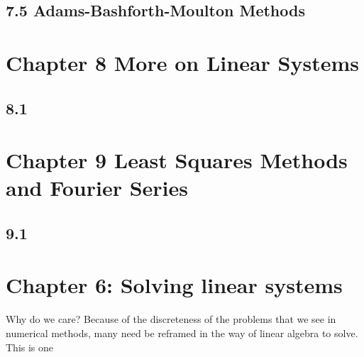 \documentclass{article}
\theoremstyle{remark}
\begin{document}
\subsection{7.5 Adams-Bashforth-Moulton Methods }


\section{Chapter 8 More on Linear Systems} 

\subsection{8.1 }


\section{Chapter 9 Least Squares Methods and Fourier Series} 

\subsection{9.1 }




\section{Chapter 6: Solving linear systems}

Why do we care? Because of the discreteness of the problems that we see in numerical methods, many need be reframed in the way of linear algebra to solve. This is one
\end{document}
